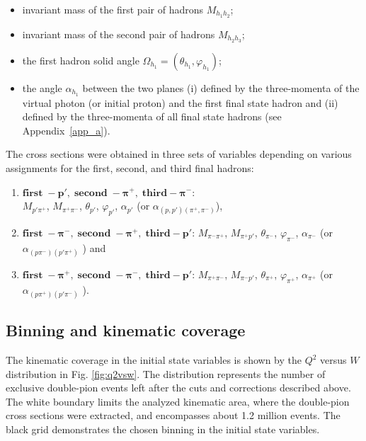 \documentclass[prc,twocolumn,superscriptaddress,showpacs,amssymb,amsmath,amsfonts,aps,nofootinbib]{revtex4-1}
\begin{document}
\begin{itemize}
\item invariant mass of the first pair of 
hadrons $M_{h_{1}h_{2}}$;
\item invariant mass of the second pair of
hadrons $M_{h_{2}h_{3}}$;
\item the first hadron solid angle $\Omega_{h_{1}} = (\theta_{h_{1}}, \varphi_{h_{1}})$;
\item the angle $\alpha_{h_{1}}$ between the two planes (i) defined by the three-momenta of
the virtual photon (or initial proton) and the first final state hadron and (ii) defined by the three-momenta of all final state hadrons (see Appendix~\ref{app_a}).
\end{itemize}


The cross sections  were obtained in three sets of variables depending on
various assignments for the first, second, and
third final hadrons:

\begin{enumerate}
\item $\boldsymbol{first\; - p',\; second \; - \pi^{+},\; third - \pi^{-}}$: \\ $M_{p'\pi^{+}}$, $M_{\pi^{+}\pi^{-}}$, $\theta_{p'}$, $\varphi_{p'}$,  $\alpha_{p'}$ (or $\alpha_{(p,p')(\pi^{+},\pi^{-})}$),
\item $\boldsymbol{first\; - \pi^{-},\; second \; - \pi^{+},\; third - p'}$: $M_{\pi^{-}\pi^{+}}$, $M_{\pi^{+}p'}$, $\theta_{\pi^{-}}$, $\varphi_{\pi^{-}}$, $\alpha_{\pi^{-}}$ (or $\alpha_{(p\pi^{-})(p'\pi^{+})}$ ) and
\item $\boldsymbol{first\; - \pi^{+},\; second \; - \pi^{-},\; third - p'}$: $M_{\pi^{+}\pi^{-}}$, $M_{\pi^{-}p'}$, $\theta_{\pi^{+}}$, $\varphi_{\pi^{+}}$, $\alpha_{\pi^{+}}$ (or $\alpha_{(p\pi^{+})(p'\pi^{-})}$ ).
\end{enumerate}







\subsection{Binning and kinematic coverage}

The kinematic coverage in the initial state variables is shown by the $Q^{2}$ versus $W$ distribution in Fig. \ref{fig:q2vsw}. The  distribution represents the number of exclusive double-pion events left after the cuts and corrections described above. 
The white boundary limits the analyzed kinematic area, where the double-pion cross sections were extracted, and encompasses about 1.2 million events. The black grid demonstrates the chosen binning in the initial state variables. 
\end{document}
